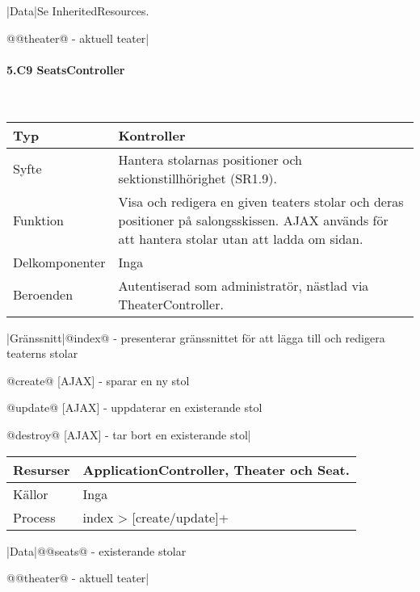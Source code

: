 \documentclass[a4paper, twoside, 11pt, titlepage]{article}
\begin{document}
			|Data|Se InheritedResources.

			@@theater@ - aktuell teater|

			\paragraph{5.C9 SeatsController}\

			\begin {table} [ht] \begin{tabular} {  p{3.5cm} p{9.6cm} }
				\hline
				Typ & Kontroller  \\
				\hline
				Syfte & Hantera stolarnas positioner och sektionstillhörighet (SR1.9).  \\
				\hline
				Funktion & Visa och redigera en given teaters stolar och deras positioner på salongsskissen. AJAX används för att hantera stolar utan att ladda om sidan.  \\
				\hline
				Delkomponenter & Inga  \\
				\hline
				Beroenden & Autentiserad som administratör, nästlad via TheaterController.  \\
				\hline
			\end{tabular} \end{table} \FloatBarrier
			\vspace{6mm}

			|Gränssnitt|@index@ - presenterar gränssnittet för att lägga till och redigera teaterns stolar

			@create@ [AJAX] - sparar en ny stol

			@update@ [AJAX] - uppdaterar en existerande stol

			@destroy@ [AJAX] - tar bort en existerande stol|

			\begin {table} [ht] \begin{tabular} {  p{3.5cm} p{9.6cm} }
				\hline
				Resurser & ApplicationController, Theater och Seat.  \\
				\hline
				Källor & Inga  \\
				\hline
				Process & index > [create/update]+  \\
				\hline
			\end{tabular} \end{table} \FloatBarrier
			\vspace{6mm}

			|Data|@@seats@ - existerande stolar

			@@theater@ - aktuell teater|
\end{document}
